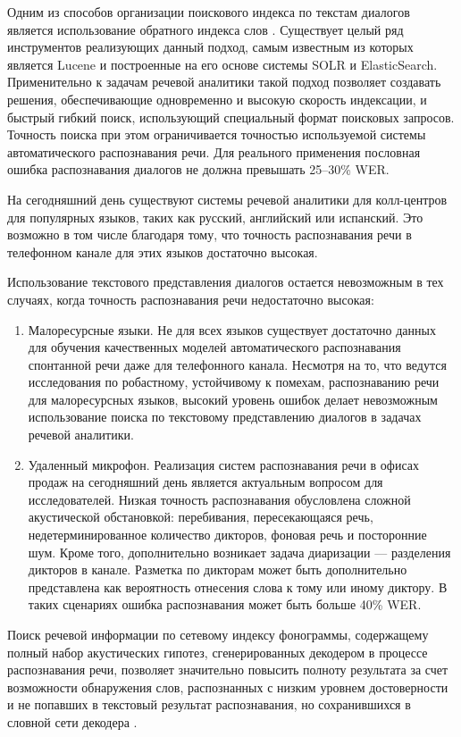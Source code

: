 Одним из способов организации поискового индекса по текстам диалогов является использование обратного индекса слов \cite{InvertedFiles}. Существует целый ряд инструментов реализующих данный подход, самым известным из которых является Lucene и построенные на его основе системы SOLR и ElasticSearch. Применительно к задачам речевой аналитики такой подход позволяет создавать решения, обеспечивающие одновременно и высокую скорость индексации, и быстрый гибкий поиск, использующий специальный формат поисковых запросов. Точность поиска при этом ограничивается точностью используемой системы автоматического распознавания речи. Для реального применения пословная ошибка распознавания диалогов не должна превышать 25--30\% WER.

На сегодняшний день существуют системы речевой аналитики для колл-центров для популярных языков, таких как русский, английский или испанский. Это возможно в том числе благодаря тому, что точность распознавания речи в телефонном канале для этих языков достаточно высокая.

Использование текстового представления диалогов остается невозможным в тех случаях, когда точность распознавания речи недостаточно высокая:
\begin{enumerate}[beginpenalty=10000] %
  \item Малоресурсные языки. Не для всех языков существует достаточно данных для обучения качественных моделей автоматического распознавания спонтанной речи даже для телефонного канала. Несмотря на то, что ведутся исследования по робастному, устойчивому к помехам, распознаванию речи для малоресурсных языков, высокий уровень ошибок делает невозможным использование поиска по текстовому представлению диалогов в задачах речевой аналитики.
  \item Удаленный микрофон. Реализация систем распознавания речи в офисах продаж на сегодняшний день является актуальным вопросом для исследователей. Низкая точность распознавания обусловлена сложной акустической обстановкой: перебивания, пересекающаяся речь, недетерминированное количество дикторов, фоновая речь и посторонние шум. Кроме того, дополнительно возникает задача диаризации --- разделения дикторов в канале. Разметка по дикторам может быть дополнительно представлена как вероятность отнесения слова к тому или иному диктору. В таких сценариях ошибка распознавания может быть больше 40\% WER.
\end{enumerate}

Поиск речевой информации по сетевому индексу фонограммы, содержащему полный набор акустических гипотез, сгенерированных декодером в процессе распознавания речи, позволяет значительно повысить полноту результата за счет возможности обнаружения слов, распознанных с низким уровнем достоверности и не попавших в текстовый результат распознавания, но сохранившихся в словной сети декодера \cite{MohriWfstAsr,WfstDecAnatomy}.

